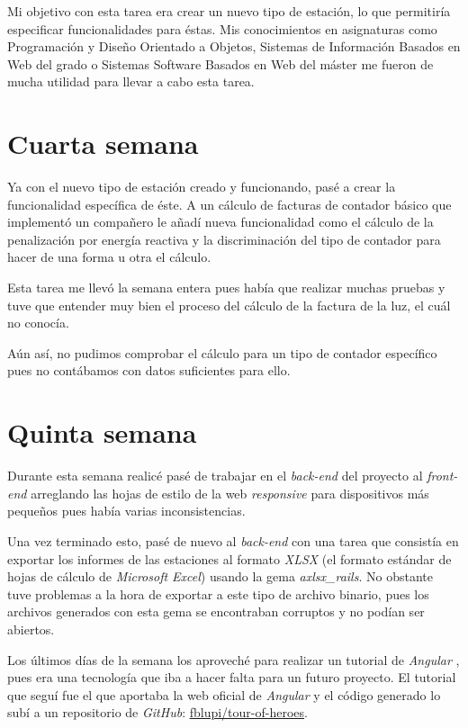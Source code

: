 Mi objetivo con esta tarea era crear un nuevo tipo de estación, lo que permitiría especificar funcionalidades para éstas. Mis conocimientos en asignaturas como Programación y Diseño Orientado a Objetos, Sistemas de Información Basados en Web del grado o Sistemas Software Basados en Web del máster me fueron de mucha utilidad para llevar a cabo esta tarea.

\section{Cuarta semana}

Ya con el nuevo tipo de estación creado y funcionando, pasé a crear la funcionalidad específica de éste. A un cálculo de facturas de contador básico que implementó un compañero le añadí nueva funcionalidad como el cálculo de la penalización por energía reactiva y la discriminación del tipo de contador para hacer de una forma u otra el cálculo.

Esta tarea me llevó la semana entera pues había que realizar muchas pruebas y tuve que entender muy bien el proceso del cálculo de la factura de la luz, el cuál no conocía.

Aún así, no pudimos comprobar el cálculo para un tipo de contador específico pues no contábamos con datos suficientes para ello.

\section{Quinta semana}

Durante esta semana realicé pasé de trabajar en el \textit{back-end} del proyecto al \textit{front-end} arreglando las hojas de estilo de la web \textit{responsive} para dispositivos más pequeños pues había varias inconsistencias.

Una vez terminado esto, pasé de nuevo al \textit{back-end} con una tarea que consistía en exportar los informes de las estaciones al formato \textit{XLSX} (el formato estándar de hojas de cálculo de \textit{Microsoft Excel}) usando la gema \textit{axlsx\_rails}. No obstante tuve problemas a la hora de exportar a este tipo de archivo binario, pues los archivos generados con esta gema se encontraban corruptos y no podían ser abiertos.

Los últimos días de la semana los aproveché para realizar un tutorial de \textit{Angular} \cite{angular}, pues era una tecnología que iba a hacer falta para un futuro proyecto. El tutorial que seguí fue el que aportaba la web oficial de \textit{Angular} y el código generado lo subí a un repositorio de \textit{GitHub}: \href{https://github.com/fblupi/tour-of-heroes}{fblupi/tour-of-heroes}.

